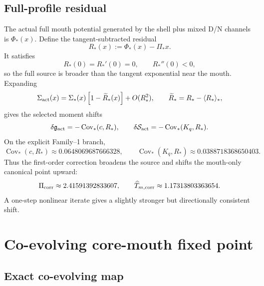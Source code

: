 \subsection{Full-profile residual}
\label{subsec:part04-full-profile-residual}

The actual full mouth potential generated by the shell plus mixed D/N channels is \(\Phi_*(x)\).  Define the tangent-subtracted residual
\begin{equation}
\label{eq:part04-Rstar-def}
R_*(x):=\Phi_*(x)-\Pi_*x.
\end{equation}
It satisfies
\begin{equation}
\label{eq:part04-Rstar-curvature}
R_*(0)=R_*'(0)=0,
\qquad
R_*''(0)<0,
\end{equation}
so the full source is broader than the tangent exponential near the mouth.  Expanding
\begin{equation}
\label{eq:part04-Sigma-act}
\Sigma_{\rm act}(x)
=
\Sigma_*(x)\left[1-\widetilde R_*(x)\right]+O(R_*^2),
\qquad
\widetilde R_*=R_*-\langle R_*\rangle_*,
\end{equation}
gives the selected moment shifts
\begin{equation}
\label{eq:part04-covariance-shifts}
\delta\mathfrak g_{\rm act}=-\operatorname{Cov}_*(c,R_*),
\qquad
\delta\mathcal S_{\rm act}=-\operatorname{Cov}_*(K_q,R_*).
\end{equation}
On the explicit Family--1 branch,
\begin{equation}
\label{eq:part04-actual-mouth-covariances}
\operatorname{Cov}_*(c,R_*)\approx0.0648069687666328,
\qquad
\operatorname{Cov}_*(K_q,R_*)\approx0.0388718368650403.
\end{equation}
Thus the first-order correction broadens the source and shifts the mouth-only canonical point upward:
\begin{equation}
\label{eq:part04-mouth-only-corrected-point}
\Pi_{\rm corr}\approx2.41591392833607,
\qquad
\widehat T_{m,{\rm corr}}\approx1.17313803363654.
\end{equation}
A one-step nonlinear iterate gives a slightly stronger but directionally consistent shift.

\section{Co-evolving core-mouth fixed point}
\label{sec:part04_geometry_retarded_mouth:co-evolving-core-mouth-fixed-point}

\subsection{Exact co-evolving map}
\label{subsec:part04-coevolving-map}

